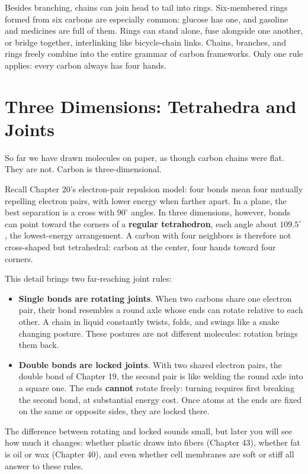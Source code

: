 Besides branching, chains can join head to tail into rings. Six-membered rings formed from six carbons are especially common: glucose has one, and gasoline and medicines are full of them. Rings can stand alone, fuse alongside one another, or bridge together, interlinking like bicycle-chain links. Chains, branches, and rings freely combine into the entire grammar of carbon frameworks. Only one rule applies: every carbon always has four hands.

\section{Three Dimensions: Tetrahedra and Joints}

So far we have drawn molecules on paper, as though carbon chains were flat. They are not. Carbon is three-dimensional.

Recall Chapter 20's electron-pair repulsion model: four bonds mean four mutually repelling electron pairs, with lower energy when farther apart. In a plane, the best separation is a cross with $90^{\circ}$ angles. In three dimensions, however, bonds can point toward the corners of a \textbf{regular tetrahedron}, each angle about $109.5^{\circ}$, the lowest-energy arrangement. A carbon with four neighbors is therefore not cross-shaped but tetrahedral: carbon at the center, four hands toward four corners.

This detail brings two far-reaching joint rules:

\begin{itemize}[itemsep=2pt]
\item \textbf{Single bonds are rotating joints}. When two carbons share one electron pair, their bond resembles a round axle whose ends can rotate relative to each other. A chain in liquid constantly twists, folds, and swings like a snake changing posture. These postures are not different molecules: rotation brings them back.
\item \textbf{Double bonds are locked joints}. With two shared electron pairs, the double bond of Chapter 19, the second pair is like welding the round axle into a square one. The ends \textbf{cannot} rotate freely: turning requires first breaking the second bond, at substantial energy cost. Once atoms at the ends are fixed on the same or opposite sides, they are locked there.
\end{itemize}

The difference between rotating and locked sounds small, but later you will see how much it changes: whether plastic draws into fibers (Chapter 43), whether fat is oil or wax (Chapter 40), and even whether cell membranes are soft or stiff all answer to these rules.

